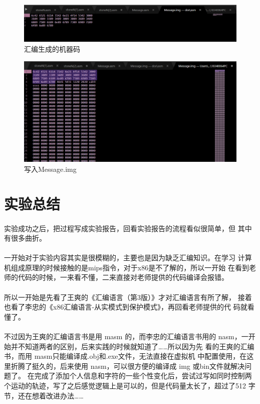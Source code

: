 \documentclass[12pt]{article}
\begin{document}
	\begin{figure}[H]
			\centering
			\includegraphics[width=12cm]{./figures/Message1.png}
			\caption{汇编生成的机器码} 
		\end{figure}	

	\begin{figure}[H]
			\centering
			\includegraphics[width=14cm]{./figures/Message2.png}
			\caption{写入Message.img} 
		\end{figure}	

\section{\LARGE 实验总结}
\paragraph{}\quad 实验成功之后，把过程写成实验报告，回看实验报告的流程看似很简单，但
其中有很多曲折。
\paragraph{}\quad 一开始对于实验内容其实是很模糊的，主要也是因为缺乏汇编知识。在学习
计算机组成原理的时候接触的是mips指令，对于x86是不了解的，所以一开始 在看到老师的代码的时候，一来看不懂，二来直接对老师提供的代码编译会报错。
\paragraph{}\quad 所以一开始是先看了王爽的《汇编语言（第3版）》才对汇编语言有所了解，
接着也看了李忠的《x86汇编语言-从实模式到保护模式》，再回看老师提供的代 码就看懂了。
\paragraph{}\quad 不过因为王爽的汇编语言书是用 masm 的，而李忠的汇编语言书用的 nasm，一开始并不知道两者的区别，后来实践的时候就知道了……所以因为先 看的王爽的汇编书，而用 masm只能编译成.obj和.exe文件，无法直接在虚拟机 中配置使用，在这里折腾了挺久的，后来使用 nasm，可以很方便的编译成 img
或bin文件就解决问题了。 在完成了添加个人信息和字符的一些个性变化后，尝试过写如同时控制两
个运动的轨迹，写了之后感觉逻辑上是可以的，但是代码量太长了，超过了512
字节，还在想着改进办法……
\end{document}
